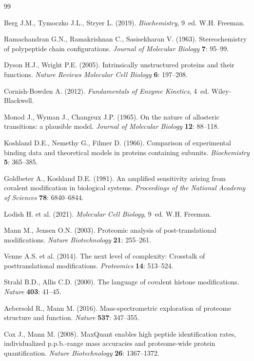 \begin{thebibliography}{99}

Berg J.M., Tymoczko J.L., Stryer L. (2019).
\textit{Biochemistry}, 9\textordfeminine\ ed.
W.H. Freeman.

Ramachandran G.N., Ramakrishnan C., Sasisekharan V. (1963).
Stereochemistry of polypeptide chain configurations.
\textit{Journal of Molecular Biology} \textbf{7}: 95--99.

Dyson H.J., Wright P.E. (2005).
Intrinsically unstructured proteins and their functions.
\textit{Nature Reviews Molecular Cell Biology} \textbf{6}: 197--208.

Cornish-Bowden A. (2012).
\textit{Fundamentals of Enzyme Kinetics}, 4\textordfeminine\ ed.
Wiley-Blackwell.

Monod J., Wyman J., Changeux J.P. (1965).
On the nature of allosteric transitions: a plausible model.
\textit{Journal of Molecular Biology} \textbf{12}: 88--118.

Koshland D.E., Nemethy G., Filmer D. (1966).
Comparison of experimental binding data and theoretical models in proteins containing
subunits.
\textit{Biochemistry} \textbf{5}: 365--385.

Goldbeter A., Koshland D.E. (1981).
An amplified sensitivity arising from covalent modification in biological systems.
\textit{Proceedings of the National Academy of Sciences} \textbf{78}: 6840--6844.

Lodish H. et al. (2021).
\textit{Molecular Cell Biology}, 9\textordfeminine\ ed.
W.H. Freeman.

Mann M., Jensen O.N. (2003).
Proteomic analysis of post-translational modifications.
\textit{Nature Biotechnology} \textbf{21}: 255--261.

Venne A.S. et al. (2014).
The next level of complexity: Crosstalk of posttranslational modifications.
\textit{Proteomics} \textbf{14}: 513--524.

Strahl B.D., Allis C.D. (2000).
The language of covalent histone modifications.
\textit{Nature} \textbf{403}: 41--45.

Aebersold R., Mann M. (2016).
Mass-spectrometric exploration of proteome structure and function.
\textit{Nature} \textbf{537}: 347--355.

Cox J., Mann M. (2008).
MaxQuant enables high peptide identification rates, individualized p.p.b.-range mass
accuracies and proteome-wide protein quantification.
\textit{Nature Biotechnology} \textbf{26}: 1367--1372.

\end{thebibliography}
